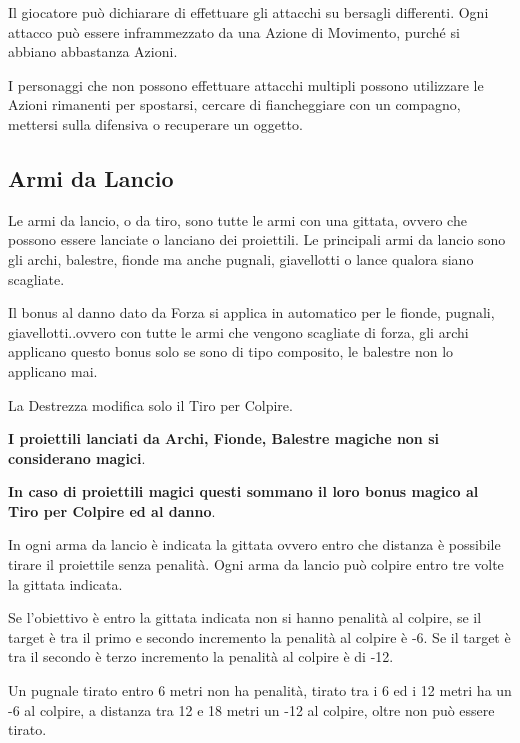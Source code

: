 \begin{multicols}{2}
Il giocatore può dichiarare di effettuare gli attacchi su bersagli differenti. Ogni attacco può essere inframmezzato da una Azione di Movimento, purché si abbiano abbastanza Azioni.

I personaggi che non possono effettuare attacchi multipli possono utilizzare le Azioni rimanenti per spostarsi, cercare di fiancheggiare con un compagno, mettersi sulla difensiva o recuperare un oggetto.


%

\subsection{Armi da Lancio}\label{armidatiro}

Le armi da lancio, o da tiro, sono tutte le armi con una gittata, ovvero che possono essere lanciate o lanciano dei proiettili. Le principali armi da lancio sono gli archi, balestre, fionde ma anche pugnali, giavellotti o lance qualora siano scagliate.

Il bonus al danno dato da Forza si applica in automatico per le fionde, pugnali, giavellotti..ovvero con tutte le armi che vengono scagliate di forza, gli archi applicano questo bonus solo se sono di tipo composito, le balestre non lo applicano mai.

La Destrezza modifica solo il Tiro per Colpire.

\textbf{I proiettili lanciati da Archi, Fionde, Balestre magiche non si considerano magici}.

\textbf{In caso di proiettili magici questi sommano il loro bonus magico al Tiro per Colpire ed al danno}.

In ogni arma da lancio è indicata la gittata ovvero entro che distanza è possibile tirare il proiettile senza penalità. Ogni arma da lancio può colpire entro tre volte la gittata indicata.

Se l'obiettivo è entro la gittata indicata non si hanno penalità al colpire, se il target è tra il primo e secondo incremento la penalità al colpire è -6. Se il target è tra il secondo è terzo incremento la penalità al colpire è di -12.

Un pugnale tirato entro 6 metri non ha penalità, tirato tra i 6 ed i 12 metri ha un -6 al colpire, a distanza tra 12 e 18 metri un -12 al colpire, oltre non può essere tirato.


\end{multicols}
